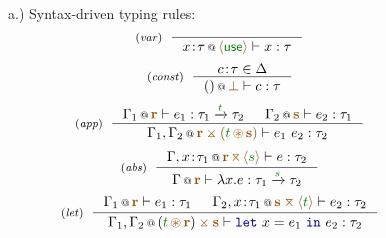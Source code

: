 \begin{figure}[t]

{\small a.) Syntax-driven typing rules:}
\begin{equation*}
\tyrule{var}
  { }
  {\coctx{x\!:\!\tau}{\alift{\cunit}} \vdash x : \tau }
\end{equation*}
\begin{equation*}
\tyrule{const}
  {c \!:\! \tau \in \Delta}
  {\coctx{()}{\azero} \vdash c : \tau }
\end{equation*}
\begin{equation*}
\tyrule{app}
  {\coctx{\Gamma_1}{\aclrd{\textbf{r}}} \vdash e_1 : \tau_1 \xrightarrow{\cclrd{t}} \tau_2 &
   \coctx{\Gamma_2}{\aclrd{\textbf{s}}} \vdash e_2 : \tau_1 }
  {\coctx{\Gamma_1, \Gamma_2}{\aclrd{\textbf{r}\;\apar\;(\cclrd{t} \,\aseq\, \aclrd{\textbf{s}})}} \vdash e_1~e_2 : \tau_2}
\end{equation*}
\begin{equation*}
\tyrule{abs}
  {\coctx{\Gamma, x\!:\!\tau_1}{\aclrd{\textbf{r}}\,\azip\,\alift{\cclrd{s}}} \vdash e : \tau_2}
  {\coctx{\Gamma}{\aclrd{\textbf{r}}} \vdash \lambda x.e : \tau_1 \xrightarrow{\cclrd{s}} \tau_2 }
\end{equation*}
\begin{equation*}
\tyrule{let}
  { \coctx{\Gamma_1}{\aclrd{\textbf{r}}} \vdash e_1 : \tau_1 &
    \coctx{\Gamma_2, x\!:\!\tau_1}{\aclrd{\textbf{s}}\;\azip\;\alift{\cclrd{t}}} \vdash e_2 : \tau_2}
  {\coctx{\Gamma_1, \Gamma_2}{(\cclrd{t} \,\aseq\, \aclrd{\textbf{r}}) \;\apar\; \aclrd{\textbf{s}}} \vdash \kvd{let}~x=e_1~\kvd{in}~e_2 : \tau_2 }
\end{equation*}


\end{figure}
